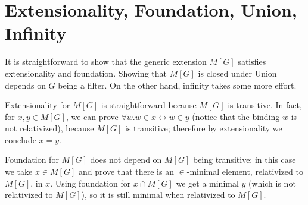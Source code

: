 \section{Extensionality, Foundation, Union, Infinity}
\label{sec:easy-axioms}
\newcommand{\quantRel}[3]{#1 #2\kern -1pt[#3]}
\newcommand{\forallRel}[2]{\quantRel{\forall}{#1}{#2}}
\newcommand{\existsRel}[2]{\quantRel{\exists}{#1}{#2}}

It is straightforward to show that the generic extension $M[G]$
satisfies extensionality and foundation. Showing that $M[G]$ is closed
under Union depends on $G$ being a filter. On the other hand, infinity
takes some more effort.


Extensionality for $M[G]$ is straightforward because $M[G]$ is
transitive. %
In fact, for $x,y\in M[G]$, we can prove
$\forall w. w\in x \leftrightarrow w\in y$ (notice that the binding
$w$ is not relativized), because $M[G]$ is transitive; therefore by
extensionality we conclude $x=y$.

Foundation for $M[G]$ does not depend on $M[G]$ being transitive: in
this case we take $x\in M[G]$ and prove that there is an
$\in$\kern -1pt-minimal element, relativized to $M[G]$, in $x$. Using
foundation for $x\cap M[G]$ we get a minimal $y$ (which is not
relativized to $M[G]$), so it is still minimal when relativized to
$M[G]$.


